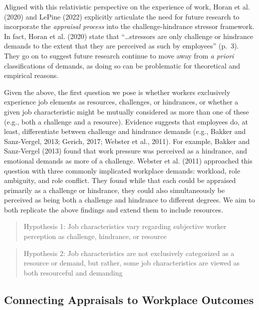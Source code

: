 \documentclass[
  man]{apa7}
\begin{document}
Aligned with this relativistic perspective on the experience of work, Horan et al. (2020) and LePine (2022) explicitly articulate the need for future research to incorporate the \emph{appraisal process} into the challenge-hindrance stressor framework. In fact, Horan et al. (2020) state that ``\ldots stressors are only challenge or hindrance demands to the extent that they are perceived as such by employees'' (p.~3). They go on to suggest future research continue to move away from \emph{a priori} classifications of demands, as doing so can be problematic for theoretical and empirical reasons.

Given the above, the first question we pose is whether workers exclusively experience job elements as resources, challenges, or hindrances, or whether a given job characteristic might be mutually considered as more than one of these (e.g., both a challenge and a resource). Evidence suggests that employees do, at least, differentiate between challenge and hindrance demands (e.g., Bakker and Sanz-Vergel, 2013; Gerich, 2017; Webster et al., 2011). For example, Bakker and Sanz-Vergel (2013) found that work pressure was perceived as a hindrance, and emotional demands as more of a challenge. Webster et al. (2011) approached this question with three commonly implicated workplace demands: workload, role ambiguity, and role conflict. They found while that each could be appraised primarily as a challenge or hindrance, they could also simultaneously be perceived as being both a challenge and hindrance to different degrees. We aim to both replicate the above findings and extend them to include resources.

\begin{quote}
Hypothesis 1: Job characteristics vary regarding subjective worker perception as challenge, hindrance, or resource
\end{quote}

\begin{quote}
Hypothesis 2: Job characteristics are not exclusively categorized as a resource or demand, but rather, some job characteristics are viewed as both resourceful and demanding
\end{quote}

\subsection{Connecting Appraisals to Workplace Outcomes}\label{connecting-appraisals-to-workplace-outcomes}
\end{document}
